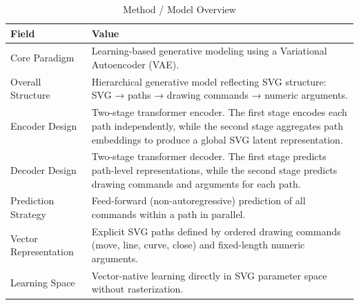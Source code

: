 \begin{table}[h!]
\centering
\caption{Method / Model Overview}
\begin{tabular}{|l|p{10cm}|}
\hline
\textbf{Field} & \textbf{Value} \\ \hline

Core Paradigm &
Learning-based generative modeling using a Variational Autoencoder (VAE). \\ \hline

Overall Structure &
Hierarchical generative model reflecting SVG structure: SVG → paths → drawing commands → numeric arguments. \\ \hline

Encoder Design &
Two-stage transformer encoder. The first stage encodes each path independently, while the second stage aggregates path embeddings to produce a global SVG latent representation. \\ \hline

Decoder Design &
Two-stage transformer decoder. The first stage predicts path-level representations, while the second stage predicts drawing commands and arguments for each path. \\ \hline

Prediction Strategy &
Feed-forward (non-autoregressive) prediction of all commands within a path in parallel. \\ \hline

Vector Representation &
Explicit SVG paths defined by ordered drawing commands (move, line, curve, close) and fixed-length numeric arguments. \\ \hline

Learning Space &
Vector-native learning directly in SVG parameter space without rasterization. \\ \hline

\end{tabular}
\end{table}

